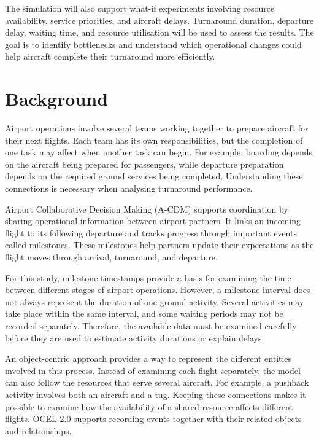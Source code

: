 The simulation will also support what-if experiments involving resource availability, service priorities, and aircraft delays. Turnaround duration, departure delay, waiting time, and resource utilisation will be used to assess the results. The goal is to identify bottlenecks and understand which operational changes could help aircraft complete their turnaround more efficiently.

\section{Background}

Airport operations involve several teams working together to prepare aircraft for their next flights. Each team has its own responsibilities, but the completion of one task may affect when another task can begin. For example, boarding depends on the aircraft being prepared for passengers, while departure preparation depends on the required ground services being completed. Understanding these connections is necessary when analysing turnaround performance.

Airport Collaborative Decision Making (A-CDM) supports coordination by sharing operational information between airport partners. It links an incoming flight to its following departure and tracks progress through important events called milestones. These milestones help partners update their expectations as the flight moves through arrival, turnaround, and departure.

For this study, milestone timestamps provide a basis for examining the time between different stages of airport operations. However, a milestone interval does not always represent the duration of one ground activity. Several activities may take place within the same interval, and some waiting periods may not be recorded separately. Therefore, the available data must be examined carefully before they are used to estimate activity durations or explain delays.

An object-centric approach provides a way to represent the different entities involved in this process. Instead of examining each flight separately, the model can also follow the resources that serve several aircraft. For example, a pushback activity involves both an aircraft and a tug. Keeping these connections makes it possible to examine how the availability of a shared resource affects different flights. OCEL 2.0 supports recording events together with their related objects and relationships.

